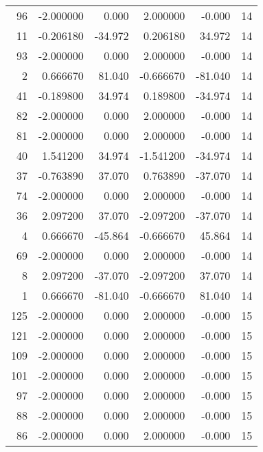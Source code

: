 \begin{tabular}{rrrrrr}
 96 & -2.000000 &    0.000 &    2.000000 &      -0.000 &  14 \\
 11 & -0.206180 &  -34.972 &    0.206180 &      34.972 &  14 \\
 93 & -2.000000 &    0.000 &    2.000000 &      -0.000 &  14 \\
  2 &  0.666670 &   81.040 &   -0.666670 &     -81.040 &  14 \\
 41 & -0.189800 &   34.974 &    0.189800 &     -34.974 &  14 \\
 82 & -2.000000 &    0.000 &    2.000000 &      -0.000 &  14 \\
 81 & -2.000000 &    0.000 &    2.000000 &      -0.000 &  14 \\
 40 &  1.541200 &   34.974 &   -1.541200 &     -34.974 &  14 \\
 37 & -0.763890 &   37.070 &    0.763890 &     -37.070 &  14 \\
 74 & -2.000000 &    0.000 &    2.000000 &      -0.000 &  14 \\
 36 &  2.097200 &   37.070 &   -2.097200 &     -37.070 &  14 \\
  4 &  0.666670 &  -45.864 &   -0.666670 &      45.864 &  14 \\
 69 & -2.000000 &    0.000 &    2.000000 &      -0.000 &  14 \\
  8 &  2.097200 &  -37.070 &   -2.097200 &      37.070 &  14 \\
  1 &  0.666670 &  -81.040 &   -0.666670 &      81.040 &  14 \\
125 & -2.000000 &    0.000 &    2.000000 &      -0.000 &  15 \\
121 & -2.000000 &    0.000 &    2.000000 &      -0.000 &  15 \\
109 & -2.000000 &    0.000 &    2.000000 &      -0.000 &  15 \\
101 & -2.000000 &    0.000 &    2.000000 &      -0.000 &  15 \\
 97 & -2.000000 &    0.000 &    2.000000 &      -0.000 &  15 \\
 88 & -2.000000 &    0.000 &    2.000000 &      -0.000 &  15 \\
 86 & -2.000000 &    0.000 &    2.000000 &      -0.000 &  15 \\
\bottomrule
\end{tabular}

